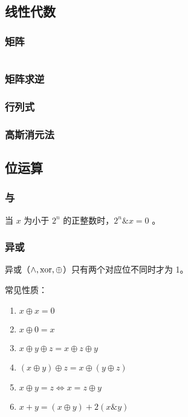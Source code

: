 \documentclass[a4paper, twoside]{article}
\begin{document}
\subsection{线性代数}
    \subsubsection{矩阵}
    \inputminted{cpp}{../src/数学/矩阵.cpp}

    \subsubsection{矩阵求逆}

    \subsubsection{行列式}

    \subsubsection{高斯消元法}

\subsection{位运算}
    \subsubsection{与}
    当 $x$ 为小于 $2^{n}$ 的正整数时，$2^{n} \mathrel{\&} x=0$ 。

    \subsubsection{异或}
    异或（$\wedge, \rm{xor}, \oplus$）只有两个对应位不同时才为 1。
    
    常见性质：
    \begin{enumerate}
        \item $x \oplus x = 0$
        \item $x \oplus 0 = x$
        \item $x \oplus y \oplus z = x \oplus z \oplus y$
        \item $(x \oplus y) \oplus z = x \oplus (y \oplus z)$
        \item $x \oplus y = z \Leftrightarrow x = z \oplus y$
        \item $x + y = (x \oplus y) + 2(x \mathrel{\&} y)$
    \end{enumerate} 
\end{document}

